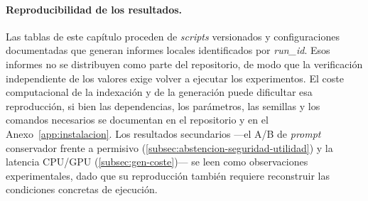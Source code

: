 \paragraph{Reproducibilidad de los resultados.} Las tablas de este capítulo proceden de \emph{scripts} versionados y configuraciones documentadas que generan informes locales identificados por \emph{run\_id}. Esos informes no se distribuyen como parte del repositorio, de modo que la verificación independiente de los valores exige volver a ejecutar los experimentos. El coste computacional de la indexación y de la generación puede dificultar esa reproducción, si bien las dependencias, los parámetros, las semillas y los comandos necesarios se documentan en el repositorio y en el Anexo~\ref{app:instalacion}. Los resultados secundarios —el A/B de \emph{prompt} conservador frente a permisivo (\ref{subsec:abstencion-seguridad-utilidad}) y la latencia CPU/GPU (\ref{subsec:gen-coste})— se leen como observaciones experimentales, dado que su reproducción también requiere reconstruir las condiciones concretas de ejecución.
